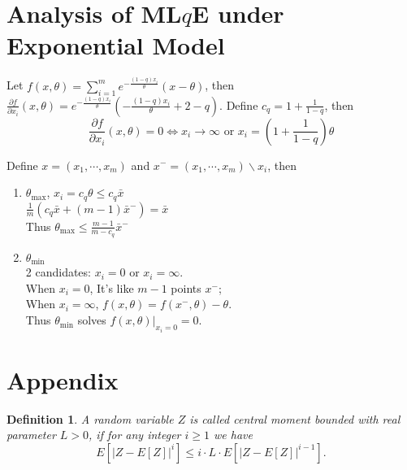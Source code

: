 \documentclass[a4paper]{article}
\newtheorem{definition}[fact]{Definition}
\begin{document}
\newpage

\section{Analysis of ML$q$E under Exponential Model}

Let $f(x, \theta) = \sum_{i=1}^m e^{-\frac{(1-q) x_i}{\theta}} (x - \theta)$, then $\frac{\partial f}{\partial x_i}(x, \theta) = e^{-\frac{(1-q) x_i}{\theta}} \left( - \frac{(1-q) x_i}{\theta} + 2 - q \right)$.
Define $c_q = 1 + \frac{1}{1-q}$, then
\[
	\frac{\partial f}{\partial x_i}(x, \theta) = 0 \Leftrightarrow
    x_i \to \infty \text{ or } x_i = (1 + \frac{1}{1-q}) \theta
\]

Define $x = (x_1, \cdots, x_m)$ and $x^- = (x_1, \cdots, x_m) \backslash x_i$, then
\begin{enumerate}
\item $\theta_{\mathrm{max}}$,
$x_i = c_q \theta \le c_q \bar{x}$ \\
$\frac{1}{m} \left( c_q \bar{x} + (m-1) \bar{x}^- \right) = \bar{x}$ \\
Thus $\theta_{\mathrm{max}} \le \frac{m-1}{m-c_q} \bar{x}^-$
\item $\theta_{\mathrm{min}}$ \\
2 candidates: $x_i = 0$ or $x_i = \infty$.\\
When $x_i = 0$, It's like $m-1$ points $x^-$; \\
When $x_i = \infty$, $f(x,\theta) = f(x^-, \theta) - \theta$. \\
Thus $\theta_{\mathrm{min}}$ solves $f(x,\theta)|_{x_i = 0} = 0$.
\end{enumerate}



\section{Appendix}
\begin{definition}
\label{def:CentralMomentBounded}
A random variable $Z$ is called central moment bounded with real parameter $L > 0$,
if for any integer $i \ge 1$ we have
\[
	E\left[ \left| Z - E[Z] \right|^i \right] \le
    i \cdot L \cdot E\left[ \left| Z - E[Z] \right|^{i-1} \right].
\]
\end{definition}



{}

\end{document}
